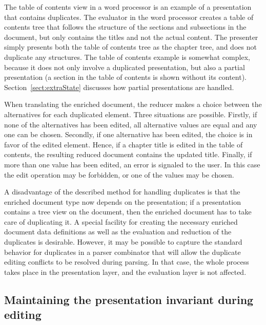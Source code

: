 The table of contents view in a word processor is an example of a presentation that contains duplicates. The evaluator in the word processor creates a table of contents tree that follows the structure of the sections and subsections in the document, but only contains the titles and not the actual content. The presenter simply presents both the table of contents tree as the chapter tree, and does not duplicate any structures. The table of contents example is somewhat complex, because it does not only involve a duplicated presentation, but also a partial presentation (a section in the table of contents is shown without its content). Section~\ref{sect:extraState} discusses how partial presentations are handled.

When translating the enriched document, the reducer makes a choice between the alternatives for each duplicated element. Three situations are possible. Firstly, if none of the alternatives has been edited, all alternative values are equal and any one can be chosen. Secondly, if one alternative has been edited, the choice is in favor of the edited element. Hence, if a chapter title is edited in the table of contents, the resulting reduced document contains the updated title. Finally, if more than one value has been edited, an error is signaled to the user. In this case the edit operation may be forbidden, or one of the values may be chosen.  

A disadvantage of the described method for handling duplicates is that the enriched document type now depends on the presentation; if a presentation contains a tree view on the document, then the enriched document has to take care of duplicating it. A special facility for creating the necessary enriched document data definitions as well as the evaluation and reduction of the duplicates is desirable. However, it may be possible to capture the standard behavior for duplicates in a parser combinator that will allow the duplicate editing conflicts to be resolved during parsing. In that case, the whole process takes place in the presentation layer, and the evaluation layer is not affected. 


%								
\subsection{Maintaining the presentation invariant during editing}

